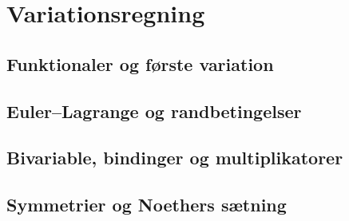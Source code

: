 \chapter{Variationsregning}
\section{Funktionaler og første variation}
\leavevmode\par

\section{Euler–Lagrange og randbetingelser}
\leavevmode\par

\section{Bivariable, bindinger og multiplikatorer}
\leavevmode\par

\section{Symmetrier og Noethers sætning}
\leavevmode\par
